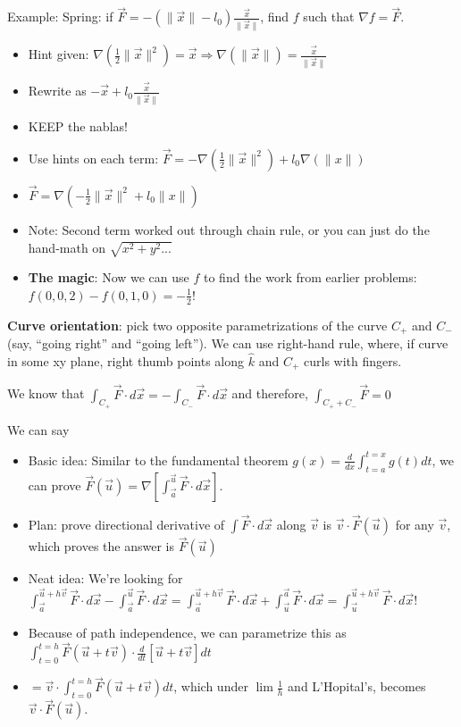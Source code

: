 \documentclass[11pt, oneside]{article}   	%
\begin{document}
Example: Spring:  if $\vec{F} = -(\|\vec{x}\| - l_0)\frac{\vec{x}}{\| \vec{x} \|}$, find $f$ such that $\nabla f = \vec{F}$.
\begin{itemize}
\item Hint given: $\nabla(\frac{1}{2} \|\vec{x}\|^2) = \vec{x} \Rightarrow \nabla (\| \vec{x} \|) = \frac{\vec{x}}{\|\vec{x}\|}$
\item Rewrite as $-\vec{x} + l_0 \frac{\vec{x}}{\|\vec{x}\|}$
\item KEEP the nablas!
\item Use hints on each term: $\vec{F} = -\nabla(\frac{1}{2} \|\vec{x}\|^2) + l_0\nabla(\|x\|)$
\item $\vec{F} = \nabla(-\frac{1}{2} \|\vec{x}\|^2 + l_0\|x\|)$
\item Note: Second term worked out through chain rule, or you can just do the hand-math on $\sqrt{x^2 + y^2...}$
\item \textbf{The magic}: Now we can use $f$ to find the work from earlier problems: $f(0, 0, 2) - f(0, 1, 0)  = -\frac{1}{2}$!
\end{itemize}

\textbf{Curve orientation}: pick two opposite parametrizations of the curve $C_+$ and $C_-$ (say, ``going right'' and ``going left'').  We can use right-hand rule, where, if curve in some xy plane, right thumb points along $\hat{k}$ and $C_+$ curls with fingers.

We know that $\int_{C_+}\vec{F}\cdot d\vec{x} = -\int_{C_-}\vec{F}\cdot d\vec{x}$ and therefore, $\int_{C_+ + C_-}\vec{F}= 0$

We can say 
\begin{itemize}
\item Basic idea: Similar to the fundamental theorem $g(x) = \frac{d}{dx} \int_{t=a}^{t=x}g(t)dt$, we can prove $\vec{F}(\vec{u}) = \nabla [\int_{\vec{a}}^{\vec{u}} \vec{F} \cdot d\vec{x} ]$.
\item Plan: prove directional derivative of $\int \vec{F} \cdot d\vec{x}$ along $\vec{v}$ is $\vec{v} \cdot \vec{F}(\vec{u})$ for any $\vec{v}$, which proves the answer is $\vec{F}(\vec{u})$
\item Neat idea: We're looking for  $\int_{\vec{a}}^{\vec{u}+h\vec{v}} \vec{F} \cdot d\vec{x} - \int_{\vec{a}}^{\vec{u}} \vec{F} \cdot d\vec{x}
=\int_{\vec{a}}^{\vec{u}+h\vec{v}} \vec{F} \cdot d\vec{x} + \int_{\vec{u}}^{\vec{a}} \vec{F} \cdot d\vec{x}
= \int_{\vec{u}}^{\vec{u}+h\vec{v}} \vec{F} \cdot d\vec{x} $!
\item Because of path independence, we can parametrize this as $\int_{t=0}^{t=h} \vec{F}(\vec{u} + t\vec{v}) \cdot \frac{d}{dt}[\vec{u} + t\vec{v}]dt$\
\item $= \vec{v} \cdot \int_{t=0}^{t=h} \vec{F}(\vec{u} + t\vec{v})dt$, which under $\lim \frac{1}{h}$ and L'Hopital's, becomes $\vec{v}\cdot \vec{F}(\vec{u})$.
\end{itemize}
\end{document}
